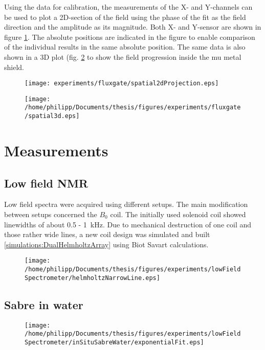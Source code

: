		Using the data for calibration, the measurements of the X- and Y-channels can be used to plot a 2D-section of the field using the phase of the fit as the field direction and the amplitude as its magnitude. Both X- and Y-sensor are shown in figure \ref{fig:results:fluxgate:plotSpatial2d}. The absolute positions are indicated in the figure to enable comparison of the individual results in the same absolute position. The same data is also shown in a 3D plot (fig. \ref{fig:results:fluxgate:plotSpatial3d} to show the field progression inside the mu metal shield.
		\begin{figure}[t]
			\label{fig:results:fluxgate:plotSpatial2d}
			\centering
			\texttt{[image: experiments/fluxgate/spatial2dProjection.eps]}
		\end{figure}
		\begin{figure}[t]
			\label{fig:results:fluxgate:plotSpatial3d}
			\centering
			\texttt{[image: /home/philipp/Documents/thesis/figures/experiments/fluxgate/spatial3d.eps]}
		\end{figure}
\section{Measurements}
	\subsection{Low field NMR}
	Low field spectra were acquired using different setups. The main modification between setups concerned the $B_0$ coil. The initially used solenoid coil showed linewidths of about 0.5 - \SI{1}{\kilo\hertz}. Due to mechanical destruction of one coil and those rather wide lines, a new coil design was simulated and built \ref{simulations:DualHelmholtzArray} using Biot Savart calculations.
	\begin{figure}[h] 
		\centering
	\end{figure}
	\begin{figure}[h]
		\centering
		\texttt{[image: /home/philipp/Documents/thesis/figures/experiments/lowFieldSpectrometer/helmholtzNarrowLine.eps]}
	\end{figure}
	\subsection{Sabre in water}
	\begin{figure}[h]
	\end{figure}
	\begin{figure}[h]
		\centering
		\texttt{[image: /home/philipp/Documents/thesis/figures/experiments/lowFieldSpectrometer/inSituSabreWater/exponentialFit.eps]}
	\end{figure}
